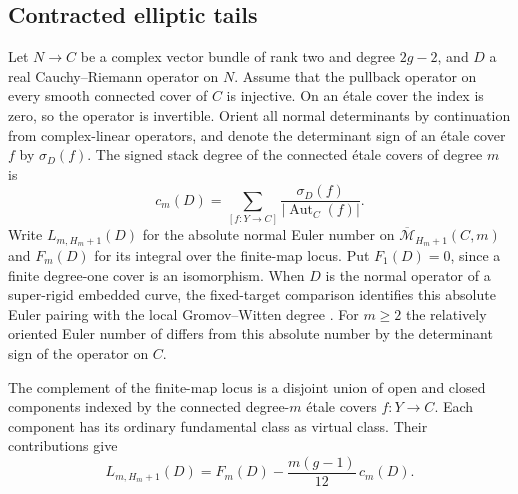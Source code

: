 \subsection{Contracted elliptic tails}\label{p8-sec:tails}

Let \(N\to C\) be a complex vector bundle of rank two and degree
\(2g-2\), and \(D\) a real Cauchy--Riemann operator on \(N\). Assume
that the pullback operator on every smooth connected cover of \(C\)
is injective. On an \'etale cover the index is zero, so the operator
is invertible. Orient all normal determinants by continuation from
complex-linear operators, and denote the determinant sign of an
\'etale cover \(f\) by \(\sigma_D(f)\). The signed stack degree of
the connected \'etale covers of degree \(m\) is
\[
 c_m(D)=\sum_{[f:Y\to C]}
                  \frac{\sigma_D(f)}{|\operatorname{Aut}_C(f)|}.
\]
Write \(L_{m,H_m+1}(D)\) for the absolute normal Euler number on
\(\overline{\mathcal M}_{H_m+1}(C,m)\) and \(F_m(D)\) for its
integral over the finite-map locus. Put \(F_1(D)=0\), since a
finite degree-one cover is an isomorphism. When \(D\) is the normal
operator of a super-rigid embedded curve, the fixed-target
comparison identifies this absolute Euler pairing with the local
Gromov--Witten degree \cite[Theorem~1.2(2)--(3)]{zinger}.
For $m\ge2$ the relatively oriented Euler number of
\cite[Definition~6.2 and Remark~6.4]{bai} differs from this absolute
number by the determinant sign of the operator on $C$.


\begin{proposition}\label{p8-prop:tails}
The complement of the finite-map locus is a disjoint union of
open and closed components indexed by the connected degree-\(m\)
\'etale covers \(f:Y\to C\). Each component has its ordinary
fundamental class as virtual class. Their contributions give
\begin{equation}\label{p8-eq:tails-identity}
         L_{m,H_m+1}(D)=F_m(D)-\frac{m(g-1)}{12}\,c_m(D).
\end{equation}
\end{proposition}

